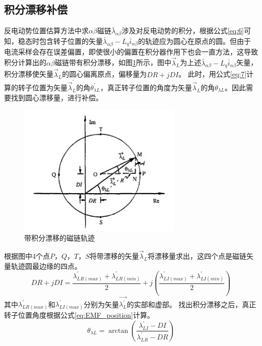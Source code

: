 \subsection{积分漂移补偿\cite{drift}}
反电动势位置估算方法中求$\alpha\beta$磁链$\bar{\lambda}_{\alpha\beta}$涉及对反电动势的积分，根据公式\ref{eq:6}可知，稳态时包含转子位置的矢量$\bar{\lambda}_{\alpha\beta}-L_{q}\bar{i}_{\alpha\beta}$的轨迹应为圆心在原点的圆。但由于电流采样会存在误差偏置，即使很小的偏置在积分器作用下也会一直方法，这导致积分计算出的$\alpha\beta$磁链带有积分漂移，如图\ref{fig:dc_removal}所示，图中$\overrightarrow{\lambda}_{L}$为上述$\bar{\lambda}_{\alpha\beta}-L_{q}\bar{i}_{\alpha\beta}$矢量，积分漂移使矢量$\overrightarrow{\lambda}_{L}$的圆心偏离原点，偏移量为$DR+jDI$。
此时，用公式\ref{eq:7}计算的转子位置为矢量$\overrightarrow{\lambda}_{L}^{\prime}$的角$\theta_{\lambda L}^{\prime}$，真正转子位置的角度为矢量$\overrightarrow{\lambda}_{L}$的角$\theta_{\lambda L}$。因此需要找到圆心漂移量，进行补偿。
\begin{figure}[H]
	\centering
	\includegraphics[width=0.7\textwidth]{figs/dc_removal.jpg}
	\caption{带积分漂移的磁链轨迹}
	\label{fig:dc_removal}
\end{figure}
根据图中4个点$P，Q，T，S$将带漂移的矢量$\overrightarrow{\lambda}_{L}$将漂移量求出，这四个点是磁链矢量轨迹圆最边缘的四点。
\begin{equation}
DR+jDI=\frac{\lambda_{LR(max)}^{\prime}+\lambda_{LR(min)}^{\prime}}{2}+j\left(\frac{\lambda_{LI(max)}^{\prime}+\lambda_{LI(min)}^{\prime}}{2} \right)
\end{equation}
其中$\lambda_{LR(max)}^{\prime}$和$\lambda_{LI(max)}^{\prime}$分别为矢量$\overrightarrow{\lambda_{L}^{\prime}}$的实部和虚部。
找出积分漂移之后，真正转子位置角度根据公式\ref{eq:EMF_position}计算。
\begin{equation}\label{eq:EMF_position}
\theta_{\lambda L}=\arctan{\left(\frac{\lambda_{LI}^{\prime}-DI}{\lambda_{LR}^{\prime}-DR}\right)}
\end{equation}
